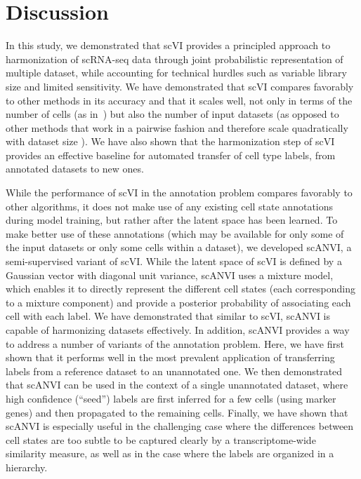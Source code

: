 \section{Discussion}
In this study, we demonstrated that scVI provides a principled approach to harmonization  of scRNA-seq data through joint probabilistic representation of multiple dataset, while accounting for technical hurdles such as variable library size and limited sensitivity. We have demonstrated that scVI compares favorably to other methods in its accuracy and that it scales well, not only in terms of the number of cells (as in~\cite{scvi}) but also the number of input datasets (as opposed to other methods that work in a pairwise fashion and therefore scale quadratically with dataset size \cite{scanorama}). We have also shown that the harmonization step of scVI provides an effective baseline for automated transfer of cell type labels, from annotated datasets to new ones. 

While the performance of scVI in the annotation problem compares favorably to other algorithms, it does not make use of any existing cell state annotations during model training, but rather after the latent space has been learned. To make better use of these annotations (which may be available for only some of the input datasets or only some cells within a dataset), we developed scANVI, a semi-supervised variant of scVI. While the latent space of scVI is defined by a Gaussian vector with diagonal unit variance, scANVI uses a mixture model, which enables it to directly represent the different cell states (each corresponding to a mixture component) and provide a posterior probability of associating each cell with each label. We have demonstrated that similar to scVI, scANVI is capable of harmonizing datasets effectively. In addition, scANVI provides a way to address a number of variants of the annotation problem. Here, we have first shown that it performs well in the most prevalent application of transferring labels from a reference dataset to an unannotated one. We then demonstrated that scANVI can be used in the context of a single unannotated dataset, where high confidence (``seed'') labels are first inferred for a few cells (using marker genes) and then propagated to the remaining cells. Finally, we have shown that scANVI is especially useful in the challenging case where the differences between cell states are too subtle to be captured clearly by a transcriptome-wide similarity measure, as well as in the case where the labels are organized in a hierarchy. 

